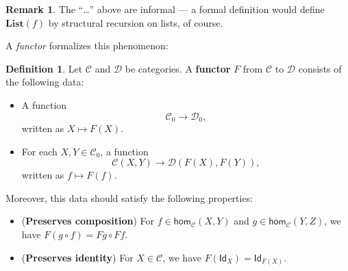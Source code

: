 \documentclass[a4paper,10pt]{scrartcl}
\theoremstyle{plain}
\theoremstyle{definition}
\newtheorem{rem}[thm]{Remark}
\newtheorem{dfn}[thm]{Definition}
\newcommand{\cfont}[1]{\ensuremath{\mathsf{#1}}}
\newcommand{\Cat}[1]{\mathcal{#1}}
\newcommand{\CC}{\Cat{C}}
\newcommand{\DD}{\Cat{D}}
\newcommand{\Catb}[1]{\mathbf{#1}}
\newcommand{\List}{\Catb{List}}
\newcommand{\Ob}[1]{{#1}_0}
\newcommand{\Hom}[3][]{\cfont{hom}_{#1}(#2,#3)}
\newcommand{\CHom}[3]{{#1}(#2,#3)}
\newcommand{\Id}[1][]{\cfont{Id}_{#1}}
\newcommand{\co}[2]{\ensuremath{#2 \circ #1}}
\begin{document}
\begin{rem}
  The ``\ldots'' above are informal --- a formal definition would define $\List(f)$ by structural recursion on lists, of course.
\end{rem}

A \textit{functor} formalizes this phenomenon:
\begin{dfn} Let $\CC$ and $\DD$ be categories. A \textbf{functor} $F$ from $\CC$ to $\DD$ consists of the following data:
\begin{itemize}
\item A function 
\[
\Ob{\CC} \to \Ob{\DD},
\]
written as $X\mapsto F(X)$.
\item For each $X,Y\in \Ob{\CC}$, a function
\[
\CHom{\CC}{X}{Y} \to \CHom{\DD}{F(X)}{F(Y)},
\]
written as $f\mapsto F(f)$.
\end{itemize}
Moreover, this data should satisfy the following properties:
\begin{itemize}
\item (\textbf{Preserves composition}) For $f\in \Hom[\CC]{X}{Y}$ and $g\in \Hom[\CC]{Y}{Z}$, we have $F(\co f g) = \co {Ff}{Fg}$.
\item (\textbf{Preserves identity}) For $X\in\CC$, we have $F(\Id[X]) = \Id[F(X)]$.
\end{itemize}
\end{dfn}
\end{document}
